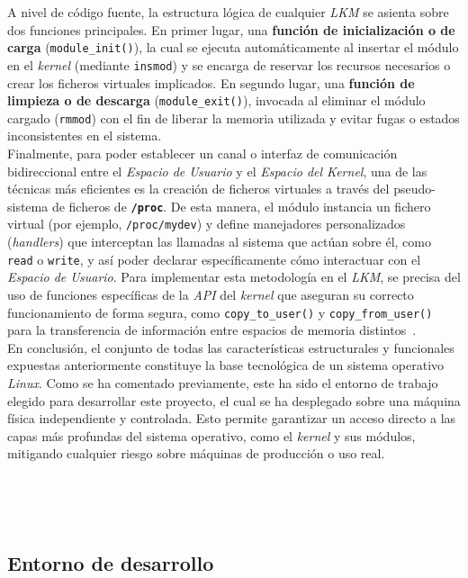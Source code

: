 A nivel de código fuente, la estructura lógica de cualquier \textit{LKM} se asienta sobre dos funciones principales.
En primer lugar, una \textbf{función de inicialización o de carga} (\texttt{module\_init()}), la cual se ejecuta automáticamente al insertar el módulo en el \textit{kernel} (mediante \texttt{insmod}) y se encarga de reservar los recursos necesarios o crear los ficheros virtuales implicados.
En segundo lugar, una \textbf{función de limpieza o de descarga} (\texttt{module\_exit()}), invocada al eliminar el módulo cargado (\texttt{rmmod}) con el fin de liberar la memoria utilizada y evitar fugas o estados inconsistentes en el sistema.\\

Finalmente, para poder establecer un canal o interfaz de comunicación bidireccional entre el \textit{Espacio de Usuario} y el \textit{Espacio del Kernel}, una de las técnicas más eficientes es la creación de ficheros virtuales a través del pseudo-sistema de ficheros de \textbf{\texttt{/proc}}.
De esta manera, el módulo instancia un fichero virtual (por ejemplo, \texttt{/proc/mydev}) y define manejadores personalizados (\textit{handlers}) que interceptan las llamadas al sistema que actúan sobre él, como \texttt{read} o \texttt{write}, y así poder declarar específicamente cómo interactuar con el \textit{Espacio de Usuario}.
Para implementar esta metodología en el \textit{LKM}, se precisa del uso de funciones específicas de la \textit{API} del \textit{kernel} que aseguran su correcto funcionamiento de forma segura, como \texttt{copy\_to\_user()} y \texttt{copy\_from\_user()} para la transferencia de información entre espacios de memoria distintos~\cite{medium_proc}.\\

En conclusión, el conjunto de todas las características estructurales y funcionales expuestas anteriormente constituye la base tecnológica de un sistema operativo \textit{Linux}.
Como se ha comentado previamente, este ha sido el entorno de trabajo elegido para desarrollar este proyecto, el cual se ha desplegado sobre una máquina física independiente y controlada.
Esto permite garantizar un acceso directo a las capas más profundas del sistema operativo, como el \textit{kernel} y sus módulos, mitigando cualquier riesgo sobre máquinas de producción o uso real.

\

\

\subsection{Entorno de desarrollo}
\label{sec:denv}

